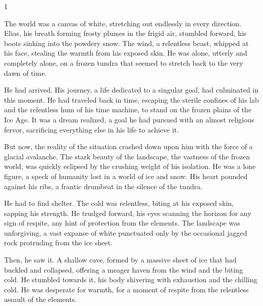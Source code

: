 \documentclass{article}
\newcommand{\Agentsroomzs}{\textsc{Agents' Room$_{ZS}$}}
\begin{document}
	\newpage 
	
	\begin{tcolorbox}[colback=white, colframe=gray!30!white, coltitle=black, parskip=5mm, title=
    \textbf{System output: \Agentsroomzs}, breakable]
    \scriptsize
    \begin{spacing}{1}
    
    The world was a canvas of white, stretching out endlessly in every direction. Elias, his breath forming frosty plumes in the frigid air, stumbled forward, his boots sinking into the powdery snow. The wind, a relentless beast, whipped at his face, stealing the warmth from his exposed skin.  He was alone, utterly and completely alone, on a frozen tundra that seemed to stretch back to the very dawn of time.\\\par

He had arrived. His journey, a life dedicated to a singular goal, had culminated in this moment.  He had traveled back in time, escaping the sterile confines of his lab and the relentless hum of his time machine, to stand on the frozen plains of the Ice Age. It was a dream realized, a goal he had pursued with an almost religious fervor, sacrificing everything else in his life to achieve it.\\\par

But now, the reality of the situation crashed down upon him with the force of a glacial avalanche. The stark beauty of the landscape, the vastness of the frozen world, was quickly eclipsed by the crushing weight of his isolation.  He was a lone figure, a speck of humanity lost in a world of ice and snow.  His heart pounded against his ribs, a frantic drumbeat in the silence of the tundra.\\\par

He had to find shelter. The cold was relentless, biting at his exposed skin, sapping his strength. He trudged forward, his eyes scanning the horizon for any sign of respite, any hint of protection from the elements.  The landscape was unforgiving, a vast expanse of white punctuated only by the occasional jagged rock protruding from the ice sheet.\\\par

Then, he saw it. A shallow cave, formed by a massive sheet of ice that had buckled and collapsed, offering a meager haven from the wind and the biting cold.  He stumbled towards it, his body shivering with exhaustion and the chilling cold.  He was desperate for warmth, for a moment of respite from the relentless assault of the elements.\\\par


\end{spacing}
\end{tcolorbox}
\end{document}
